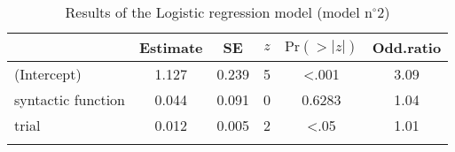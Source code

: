\begin{table}
\begin{tabular}{l S[table-format=1.3] S[table-format=1.3] S[table-format=1] S[table-format=<1.4] S[table-format=1.2]}
  \lsptoprule
 & {Estimate} & {SE} & {$z$} & {$\text{Pr}(>|z|)$} & {Odd.ratio} \\ 
  \midrule
(Intercept) & 1.127 & 0.239 & 5 & <.001 & 3.09 \\ 
  syntactic function & 0.044 & 0.091 & 0 & 0.6283 & 1.04 \\ 
  trial & 0.012 & 0.005 & 2 & <.05 & 1.01 \\ 
   \lspbottomrule
\end{tabular}
\caption{Results of the Logistic regression model (model n$^{\circ}$2)}
\label{tab:exp02-m2}
\end{table}
